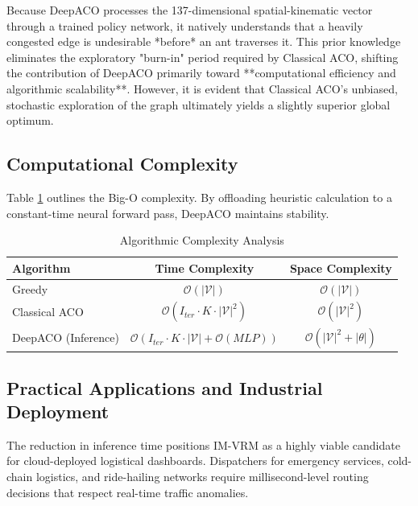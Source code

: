 \documentclass[conference]{IEEEtran}
\begin{document}
Because DeepACO processes the 137-dimensional spatial-kinematic vector through a trained policy network, it natively understands that a heavily congested edge is undesirable *before* an ant traverses it. This prior knowledge eliminates the exploratory "burn-in" period required by Classical ACO, shifting the contribution of DeepACO primarily toward **computational efficiency and algorithmic scalability**. However, it is evident that Classical ACO's unbiased, stochastic exploration of the graph ultimately yields a slightly superior global optimum.

\subsection{Computational Complexity}
Table \ref{tab:complexity} outlines the Big-O complexity. By offloading heuristic calculation to a constant-time neural forward pass, DeepACO maintains stability.

\begin{table}[htbp]
\centering
\caption{Algorithmic Complexity Analysis}
\label{tab:complexity}
\begin{tabular}{@{}lcc@{}}
\toprule
\textbf{Algorithm} & \textbf{Time Complexity} & \textbf{Space Complexity} \\ \midrule
Greedy & $\mathcal{O}(|\mathcal{V}|)$ & $\mathcal{O}(|\mathcal{V}|)$ \\
Classical ACO & $\mathcal{O}(I_{ter} \cdot K \cdot |\mathcal{V}|^2)$ & $\mathcal{O}(|\mathcal{V}|^2)$ \\
DeepACO (Inference) & $\mathcal{O}(I_{ter} \cdot K \cdot |\mathcal{V}| + \mathcal{O}(MLP))$ & $\mathcal{O}(|\mathcal{V}|^2 + |\theta|)$ \\ \bottomrule
\end{tabular}
\end{table}

\subsection{Practical Applications and Industrial Deployment}
The reduction in inference time positions IM-VRM as a highly viable candidate for cloud-deployed logistical dashboards. Dispatchers for emergency services, cold-chain logistics, and ride-hailing networks require millisecond-level routing decisions that respect real-time traffic anomalies. 
\end{document}
